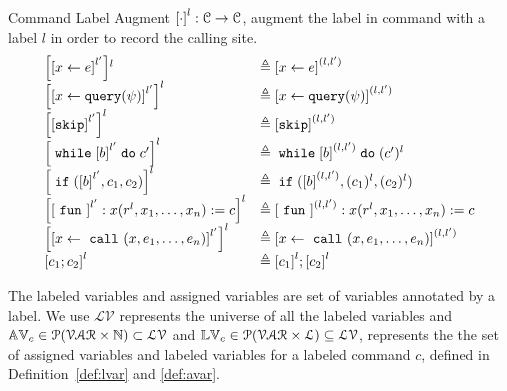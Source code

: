 {{\begin{defn}
  Command Label Augment $ \clabel{\cdot}^{l} : {\cdom \to \cdom}$, augment the label in command with a label $l$ 
in order to record the calling site.
\[
\begin{array}{ll}
  \clabel{\clabel{\assign{x}{\expr}}^{l'}}{}^{l} & \triangleq \clabel{\assign{x}{\expr}}^{(l, l')}\\
  \clabel{\clabel{\assign{x}{\query(\qexpr)}}^{l'}}^{l} & \triangleq \clabel{\assign{x}{\query(\qexpr)}}^{(l, l')}\\
  \clabel{\clabel{\eskip}^{l'}}^{l} & \triangleq \clabel{\eskip}^{(l, l')}\\
  \clabel{\ewhile \clabel{\bexpr}^{l'} \edo {c'}}^{l} & \triangleq \ewhile \clabel{\bexpr}^{(l, l')} \edo {(c')^{l}}\\
  \clabel{\eif(\clabel{\bexpr}^{l'} , {c_1}, {c_2})}^{l}  & \triangleq \eif(\clabel{\bexpr}^{(l, l')} , {(c_1)^{l}}, {(c_2)^{l}})\\
  \clabel{\clabel{\efun}^{l'}: x(r^l, x_1, \ldots, x_n) := c}^{l} & \triangleq \clabel{\efun}^{(l, l')}: x(r^l, x_1, \ldots, x_n) := c \\
  \clabel{\clabel{\assign{x}{\ecall(x, e_1, \ldots, e_n)}}^{l'}}^{l} & \triangleq \clabel{\assign{x}{\ecall(x, e_1, \ldots, e_n)}}^{(l, l')}\\
  \clabel{{c_1};{c_2}}^{l} &  \triangleq \clabel{c_1}^{l};\clabel{c_2}^{l}
\end{array}
\]
\end{defn}
}
The labeled variables and assigned variables are set of variables annotated by a label. 
We use  
$\mathcal{LV}$ represents the universe of all the labeled variables and 
$\mathbb{AV}_c \in \mathcal{P}(\mathcal{VAR} \times \mathbb{N}) \subset \mathcal{LV}$ and 
$\mathbb{LV}_c \in \mathcal{P}(\mathcal{VAR} \times \mathcal{L}) \subseteq \mathcal{LV}$,
represents the the set of assigned variables and labeled variables for a labeled command $c$,
defined in Definition~\ref{def:lvar} and \ref{def:avar}.
%
\\
}
